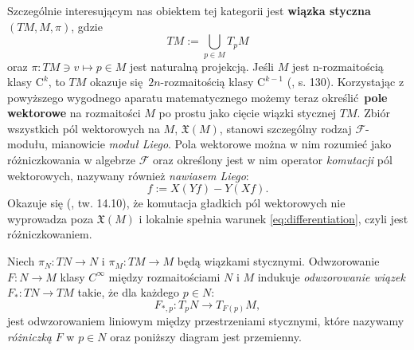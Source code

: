 Szczególnie interesującym nas obiektem tej kategorii jest \textbf{wiązka styczna} \((TM, M, \pi)\), gdzie 
\begin{equation*}
TM := \bigcup\limits_{p\in M} T_p M
\end{equation*}
oraz \(\pi: TM \ni v \mapsto p\in M\) jest naturalną projekcją. 
Jeśli \(M\) jest n-rozmaitością klasy \(\mathrm{C}^k\), to \(TM\) okazuje się \(2n\)-rozmaitością klasy \(\mathrm{C}^{k-1}\) (\cite{tu}, s. 130). 
Korzystając z powyższego wygodnego aparatu matematycznego możemy teraz określić \textbf{pole wektorowe} na rozmaitości \(M\) po prostu jako cięcie wiązki stycznej \(TM\). Zbiór wszystkich pól wektorowych na \(M\), \(\mathfrak{X}(M)\), stanowi szczególny rodzaj \(\mathcal{F}\)-modułu, mianowicie \emph{moduł Liego}. Pola wektorowe można w nim rozumieć jako różniczkowania w algebrze \(\mathcal{F}\) oraz określony jest w nim operator \emph{komutacji} pól wektorowych, nazywany również \emph{nawiasem Liego}:
\begin{equation*}
    [X, Y]f := X(Yf) - Y(Xf).
\end{equation*}
Okazuje się (\cite{tu}, tw. 14.10), że komutacja gładkich pól wektorowych nie wyprowadza poza \(\mathfrak{X}(M)\) i lokalnie spełnia warunek \eqref{eq:differentiation}, czyli jest różniczkowaniem.

Niech \(\pi_N: TN \to N\) i \(\pi_M: TM \to M\) będą wiązkami stycznymi. Odwzorowanie \(F:N\to M\) klasy \(C^\infty\) między rozmaitościami \(N\) i \(M\) indukuje \emph{odwzorowanie wiązek} \(F_\ast: TN\to TM\) takie, że dla każdego \(p\in N\):  
\begin{equation*}
F_{\ast, p}:T_p N\rightarrow T_{F(p)}M, 
\end{equation*}
jest odwzorowaniem liniowym między przestrzeniami stycznymi, które nazywamy \emph{różniczką} \(F\) w \(p\in N\) oraz poniższy diagram jest przemienny. 
\begin{figure}[!h]
\centering
{}
\end{figure}

